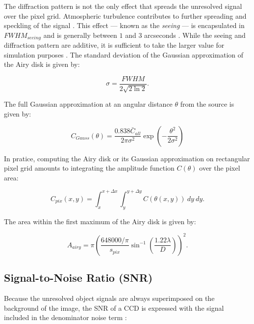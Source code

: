 The diffraction pattern is not the only effect that spreads the unresolved signal over the pixel grid. Atmospheric turbulence contributes to further spreading and speckling of the signal \cite{frueh2019notes}. This effect --- known as the \textit{seeing} --- is encapsulated in $FWHM_{seeing}$ and is generally between $1$ and $3$ arcseconds \cite{frueh2019notes}. While the seeing and diffraction pattern are additive, it is sufficient to take the larger value for simulation purposes \cite{frueh2019notes}. The standard deviation of the Gaussian approximation of the Airy disk is given by:

\begin{equation} \label{eq:airy_variance}
  \sigma = \frac{FWHM}{2 \sqrt{2 \ln{2}}}.
\end{equation}

The full Gaussian approximation at an angular distance $\theta$ from the source is given by:

\begin{equation} \label{eq:airy_gaussian}
  C_{Gauss}(\theta) = \frac{0.838 \bar{C}_{all}}{2 \pi \sigma^2} \exp\left( - \frac{\theta^2}{2 \sigma^2} \right)
\end{equation}

In pratice, computing the Airy disk or its Gaussian approximation on rectangular pixel grid amounts to integrating the amplitude function $C(\theta)$ over the pixel area:

\begin{equation}
  C_{pix}(x, y) = \int_{x}^{x + \Delta x} \int_{y}^{y + \Delta y}{C(\theta(x, y))} \: dy \: dy.
\end{equation}

The area within the first maximum of the Airy disk is given by:

\begin{equation} \label{eq:airy_area}
  A_{airy} = \pi \left(\frac{648000 / \pi}{s_{pix}} \sin^{-1}\left(\frac{1.22 \lambda}{D}\right) \right)^2.
\end{equation}

\subsection{Signal-to-Noise Ratio (SNR)}

Because the unresolved object signals are always superimposed on the background of the image, the SNR of a CCD is expressed with the signal included in the denominator noise term \cite{frueh2019notes}:

